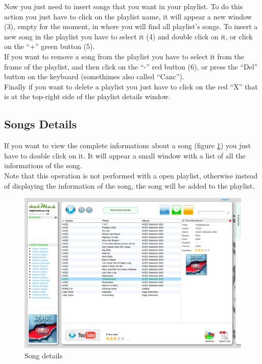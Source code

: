 Now you just need to insert songs that you want in your playlist. To do this
action you just have to click on the playlist name, it will appear a new window
(3), empty for the moment, in where you will find all playlist's songs. To
insert a new song in the playlist you have to select it (4) and double click on
it, or click on the ``+'' green button (5).\\ If you want to remove a song from
the playlist you have to select it from the frame of the playlist, and then click on the ``-''
red button (6), or press the ``Del'' button on the keyboard (somethimes also
called ``Canc'').\\

Finally if you want to delete a playlist you just have to click on the red ``X''
that is at the top-right side of the playlist details window.

\subsection{Songs Details}

If you want to view the complete informations about a song (figure
\ref{fig:dettagli}) you just have to
double click on it. It will appear a small window with a list of
all the informations of the song.\\
Note that this operation is not performed with a open playlist,
otherwise instead of displaying the information of the song, the song
will be added to the playlist.\\

\begin{figure}[!htbp]
  \centering
  \includegraphics[width=15cm]{img/MU/info_song.png}
\caption{Song details}
\label{fig:dettagli}
\end{figure}


